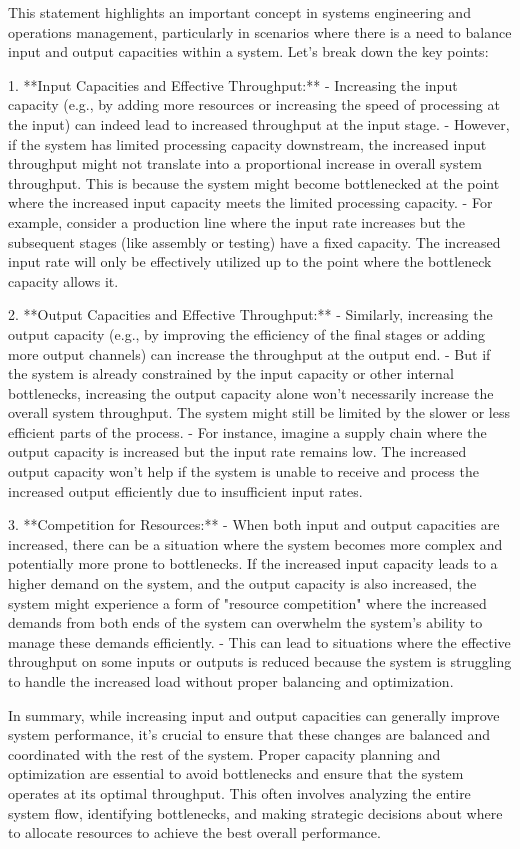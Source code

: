 This statement highlights an important concept in systems engineering and operations management, particularly in scenarios where there is a need to balance input and output capacities within a system. Let's break down the key points:

1. **Input Capacities and Effective Throughput:**
   - Increasing the input capacity (e.g., by adding more resources or increasing the speed of processing at the input) can indeed lead to increased throughput at the input stage.
   - However, if the system has limited processing capacity downstream, the increased input throughput might not translate into a proportional increase in overall system throughput. This is because the system might become bottlenecked at the point where the increased input capacity meets the limited processing capacity.
   - For example, consider a production line where the input rate increases but the subsequent stages (like assembly or testing) have a fixed capacity. The increased input rate will only be effectively utilized up to the point where the bottleneck capacity allows it.

2. **Output Capacities and Effective Throughput:**
   - Similarly, increasing the output capacity (e.g., by improving the efficiency of the final stages or adding more output channels) can increase the throughput at the output end.
   - But if the system is already constrained by the input capacity or other internal bottlenecks, increasing the output capacity alone won't necessarily increase the overall system throughput. The system might still be limited by the slower or less efficient parts of the process.
   - For instance, imagine a supply chain where the output capacity is increased but the input rate remains low. The increased output capacity won't help if the system is unable to receive and process the increased output efficiently due to insufficient input rates.

3. **Competition for Resources:**
   - When both input and output capacities are increased, there can be a situation where the system becomes more complex and potentially more prone to bottlenecks. If the increased input capacity leads to a higher demand on the system, and the output capacity is also increased, the system might experience a form of "resource competition" where the increased demands from both ends of the system can overwhelm the system's ability to manage these demands efficiently.
   - This can lead to situations where the effective throughput on some inputs or outputs is reduced because the system is struggling to handle the increased load without proper balancing and optimization.

In summary, while increasing input and output capacities can generally improve system performance, it's crucial to ensure that these changes are balanced and coordinated with the rest of the system. Proper capacity planning and optimization are essential to avoid bottlenecks and ensure that the system operates at its optimal throughput. This often involves analyzing the entire system flow, identifying bottlenecks, and making strategic decisions about where to allocate resources to achieve the best overall performance.